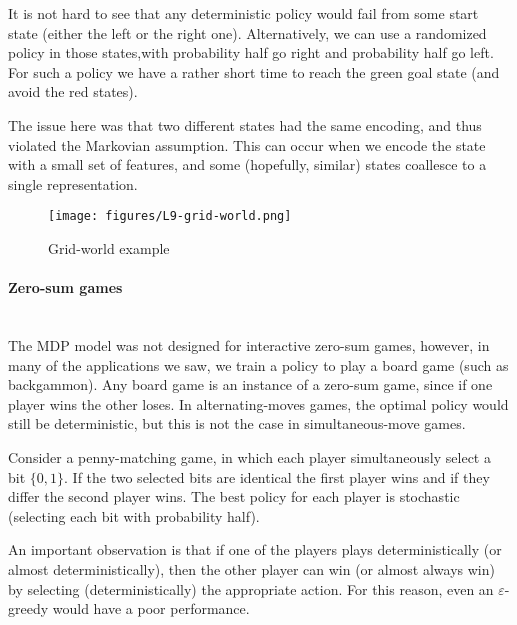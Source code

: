 It is not hard to see that any deterministic policy would fail from
some start state (either the left or the right one). Alternatively,
we can use a randomized policy in those states,with probability half
go right and probability half go left. For such a policy we have a
rather short time to reach the green goal state (and avoid the red
states).

The issue here was that two different states had the same encoding,
and thus violated the Markovian assumption. This can occur when we
encode the state with a small set of features, and some (hopefully,
similar) states coallesce to a single representation.

\begin{figure}
  \begin{centering}
  \texttt{[image: figures/L9-grid-world.png]}\\
  \caption{Grid-world example }\label{fig:L9-grid-world}
  \end{centering}
\end{figure}

\paragraph{Zero-sum games}\ \\
The MDP model was not designed for interactive zero-sum games,
however, in many of the applications we saw, we train a policy to
play a board game (such as backgammon). Any board game is an
instance of a zero-sum game, since if one player wins the other
loses. In alternating-moves games, the optimal policy would still be
deterministic, but this is not the case in simultaneous-move games.


Consider a penny-matching game, in which each player simultaneously
select a bit $\{0,1\}$. If the two selected bits are identical the
first player wins and if they differ the second player wins. The
best policy for each player is stochastic (selecting each bit with
probability half).

An important observation is that if one of the players plays
deterministically (or almost deterministically), then the other
player can win (or almost always win) by selecting
(deterministically) the appropriate action. For this reason, even
an $\varepsilon$-greedy would have a poor performance.

